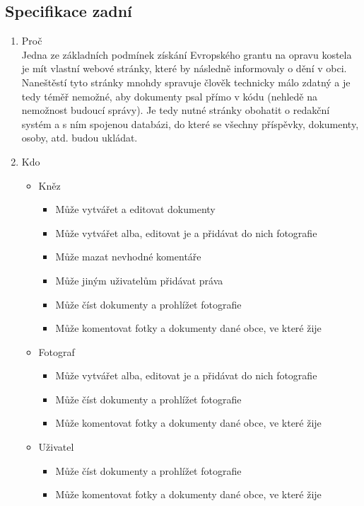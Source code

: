 \documentclass[12pt]{article}
\begin{document}
	\begin{enumerate}
		\chapter{Specifikace zadní}
		\begin{enumerate}[label*=\arabic*.]
			\item {Proč}\\
			Jedna ze základních podmínek získání Evropského grantu na opravu kostela je mít vlastní webové stránky, které by následně informovaly o dění v obci. Naneštěstí tyto stránky mnohdy spravuje člověk technicky málo zdatný a je tedy téměř nemožné, aby dokumenty psal přímo v kódu (nehledě na nemožnost budoucí správy). Je tedy nutné stránky obohatit o redakční systém a s ním spojenou databázi, do které se všechny příspěvky, dokumenty, osoby, atd. budou ukládat.
			\item {Kdo}
			\begin{itemize}
				\item Kněz
				\begin{itemize}
					\item Může vytvářet a editovat dokumenty
					\item Může vytvářet alba, editovat je a přidávat do nich fotografie
					\item Může mazat nevhodné komentáře
					\item Může jiným uživatelům přidávat práva
					\item Může číst dokumenty a prohlížet fotografie
					\item Může komentovat fotky a dokumenty dané obce, ve které žije
				\end{itemize}
			\item Fotograf
				\begin{itemize}
					\item Může vytvářet alba, editovat je a přidávat do nich fotografie
					\item Může číst dokumenty a prohlížet fotografie
					\item Může komentovat fotky a dokumenty dané obce, ve které žije
				\end{itemize}
			\item Uživatel 
				\begin{itemize}
					\item Může číst dokumenty a prohlížet fotografie
					\item Může komentovat fotky a dokumenty dané obce, ve které žije
				\end{itemize}

\end{itemize}
\end{enumerate}
\end{enumerate}
\end{document}

